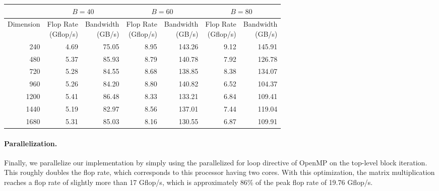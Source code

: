 \documentclass[11pt]{article}
\theoremstyle{plain} %
\begin{document}
\begin{center}
\small
\begin{tabular}{r|rr|rr|rr}
  & \multicolumn{2}{c|}{$B = 40$} & \multicolumn{2}{c|}{$B = 60$} & \multicolumn{2}{c}{$B = 80$} \\
  \hline
  Dimension & \makecell{Flop Rate \\ (Gflop/s)} & \makecell{Bandwidth \\ (GB/s)} & \makecell{Flop Rate \\ (Gflop/s)} & \makecell{Bandwidth \\ (GB/s)} & \makecell{Flop Rate \\ (Gflop/s)} & \makecell{Bandwidth \\ (GB/s)} \\
  \hline
  240 & 4.69 & 75.05 & 8.95 & 143.26 & 9.12 & 145.91 \\
  480 & 5.37 & 85.93 & 8.79 & 140.78 & 7.92 & 126.78 \\
  720 & 5.28 & 84.55 & 8.68 & 138.85 & 8.38 & 134.07 \\
  960 & 5.26 & 84.20 & 8.80 & 140.82 & 6.52 & 104.37 \\
  1200 & 5.41 & 86.48 & 8.33 & 133.21 & 6.84 & 109.41 \\
  1440 & 5.19 & 82.97 & 8.56 & 137.01 & 7.44 & 119.04 \\
  1680 & 5.31 & 85.03 & 8.16 & 130.55 & 6.87 & 109.91 \\
  \hline
\end{tabular}
\end{center}

\paragraph{Parallelization.}

Finally, we parallelize our implementation by simply using the parallelized for loop directive of OpenMP on the top-level block iteration.
This roughly doubles the flop rate, which corresponds to this processor having two cores.
With this optimization, the matrix multiplication reaches a flop rate of slightly more than 17 Gflop/s, which is approximately 86\% of the peak flop rate of 19.76 Gflop/s.
\end{document}
